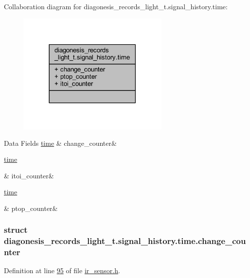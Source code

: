 Collaboration diagram for diagonesis\+\_\+records\+\_\+light\+\_\+t.\+signal\+\_\+history.\+time\+:\nopagebreak
\begin{figure}[H]
\begin{center}
\leavevmode
\includegraphics[width=213pt]{df/de9/a00923}
\end{center}
\end{figure}
\begin{DoxyFields}{Data Fields}
\hypertarget{a00017_a5c92978e62f1dc96ecf1f963daf7fea7}{\hyperlink{a00017_d2/d56/a00384}{time}}\label{a00017_a5c92978e62f1dc96ecf1f963daf7fea7}
&
change\+\_\+counter&
\\
\hline

\hypertarget{a00017_a30d23cac7aa438bec8aca291c4369f49}{\hyperlink{a00017_dd/df5/a00386}{time}}\label{a00017_a30d23cac7aa438bec8aca291c4369f49}
&
itoi\+\_\+counter&
\\
\hline

\hypertarget{a00017_a594052cc367d5077836dc3dc955a16ba}{\hyperlink{a00017_db/db9/a00387}{time}}\label{a00017_a594052cc367d5077836dc3dc955a16ba}
&
ptop\+\_\+counter&
\\
\hline

\end{DoxyFields}
\label{d2/d56/a00384}
\hypertarget{a00017_d2/d56/a00384}{}
\subsubsection{struct diagonesis\+\_\+records\+\_\+light\+\_\+t.\+signal\+\_\+history.\+time.\+change\+\_\+counter}


Definition at line \hyperlink{a00017_source_l00095}{95} of file \hyperlink{a00017_source}{ir\+\_\+sensor.\+h}.



